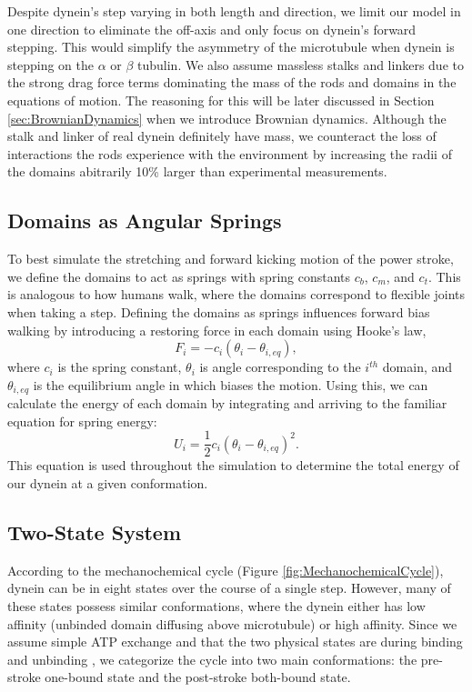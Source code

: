 Despite dynein's step varying in both length and direction, we limit our model in one direction to eliminate the off-axis and only focus on dynein's forward stepping. This would simplify the asymmetry of the microtubule when dynein is stepping on the $\alpha$ or $\beta$ tubulin. We also assume massless stalks and linkers due to the strong drag force terms dominating the mass of the rods and domains in the equations of motion. The reasoning for this will be later discussed in Section \ref{sec:BrownianDynamics} when we introduce Brownian dynamics. Although the stalk and linker of real dynein definitely have mass, we counteract the loss of interactions the rods experience with the environment by increasing the radii of the domains abitrarily 10\% larger than experimental measurements.

\subsection{Domains as Angular Springs}
To best simulate the stretching and forward kicking motion of the power stroke, we define the domains to act as springs with spring constants $c_b$, $c_m$, and $c_t$. This is analogous to how humans walk, where the domains correspond to flexible joints when taking a step. Defining the domains as springs influences forward bias walking by introducing a restoring force in each domain using Hooke's law, 
\begin{equation}
    F_i=-c_i(\theta_i-\theta_{i,eq}),
\end{equation}
where $c_i$ is the spring constant, $\theta_i$ is angle corresponding to the $i^{th}$ domain, and $\theta_{i,eq}$ is the equilibrium angle in which biases the motion. Using this, we can calculate the energy of each domain by integrating and arriving to the familiar equation for spring energy:
\begin{equation} \label{eqn:energy}
    U_i=\frac{1}{2}c_i(\theta_i-\theta_{i,eq})^2.
\end{equation}
This equation is used throughout the simulation to determine the total energy of our dynein at a given conformation. 


\subsection{Two-State System}
According to the mechanochemical cycle (Figure \ref{fig:MechanochemicalCycle}), dynein can be in eight states over the course of a single step. However, many of these states possess similar conformations, where the dynein either has low affinity (unbinded domain diffusing above microtubule) or high affinity. Since we assume simple ATP exchange and that the two physical states are during binding and unbinding \cite{}, we categorize the cycle into two main conformations: the pre-stroke one-bound state and the post-stroke both-bound state.

